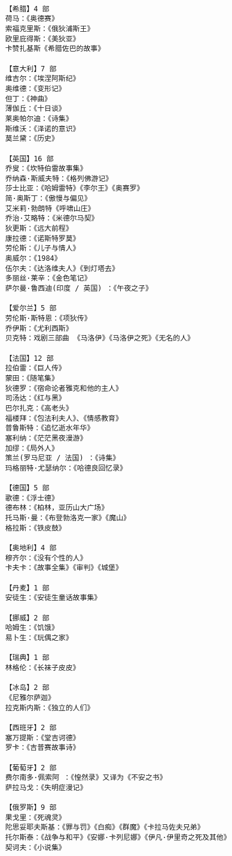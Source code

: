 \documentclass[UTF8]{../../RepresentationUniverse}
\begin{document}
\begin{lstlisting}

    【希腊】4 部
    荷马：《奥德赛》
    索福克里斯：《俄狄浦斯王》
    欧里庇得斯：《美狄亚》
    卡赞扎基斯《希腊佐巴的故事》
    
    【意大利】7 部
    维吉尔：《埃涅阿斯纪》
    奥维德：《变形记》
    但丁：《神曲》
    薄伽丘：《十日谈》
    莱奥帕尔迪：《诗集》
    斯维沃：《泽诺的意识》
    莫兰黛：《历史》
    
    【英国】16 部 
    乔叟：《坎特伯雷故事集》
    乔纳森·斯威夫特：《格列佛游记》
    莎士比亚：《哈姆雷特》《李尔王》《奥赛罗》
    简·奥斯丁：《傲慢与偏见》
    艾米莉·勃朗特《呼啸山庄》
    乔治·艾略特：《米德尔马契》
    狄更斯：《远大前程》
    康拉德：《诺斯特罗莫》
    劳伦斯：《儿子与情人》
    奥威尔：《1984》
    伍尔夫：《达洛维夫人》《到灯塔去》
    多丽丝·莱辛：《金色笔记》
    萨尔曼·鲁西迪(印度 / 英国) ：《午夜之子》
    
    【爱尔兰】5 部 
    劳伦斯·斯特恩：《项狄传》
    乔伊斯：《尤利西斯》
    贝克特：戏剧三部曲 《马洛伊》《马洛伊之死》《无名的人》
    
    【法国】12 部 
    拉伯雷：《巨人传》
    蒙田：《随笔集》
    狄德罗：《宿命论者雅克和他的主人》
    司汤达：《红与黑》
    巴尔扎克：《高老头》
    福楼拜：《包法利夫人》、《情感教育》
    普鲁斯特：《追忆逝水年华》
    塞利纳：《茫茫黑夜漫游》
    加缪：《局外人》
    策兰(罗马尼亚 / 法国) ：《诗集》
    玛格丽特·尤瑟纳尔：《哈德良回忆录》
    
    【德国】5 部
    歌德：《浮士德》
    德布林：《柏林，亚历山大广场》
    托马斯·曼：《布登勃洛克一家》《魔山》
    格拉斯：《铁皮鼓》
    
    【奥地利】4 部 
    穆齐尔：《没有个性的人》
    卡夫卡：《故事全集》《审判》《城堡》
    
    【丹麦】1 部 
    安徒生：《安徒生童话故事集》
    
    【挪威】2 部 
    哈姆生：《饥饿》
    易卜生：《玩偶之家》
    
    【瑞典】1 部
    林格伦：《长袜子皮皮》
    
    【冰岛】2 部
    《尼雅尔萨迦》
    拉克斯内斯：《独立的人们》
    
    【西班牙】2 部 
    塞万提斯：《堂吉诃德》
    罗卡：《吉普赛故事诗》
    
    【葡萄牙】2 部
    费尔南多·佩索阿 ：《惶然录》又译为《不安之书》
    萨拉马戈：《失明症漫记》
    
    【俄罗斯】9 部 
    果戈里：《死魂灵》
    陀思妥耶夫斯基：《罪与罚》《白痴》《群魔》《卡拉马佐夫兄弟》
    托尔斯泰：《战争与和平》《安娜·卡列尼娜》《伊凡·伊里奇之死及其他》
    契诃夫：《小说集》
    

\end{lstlisting}
\end{document}
